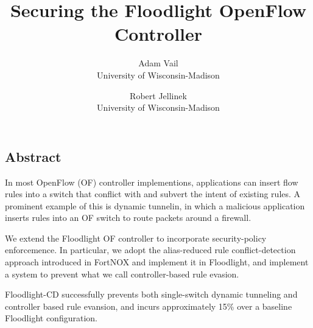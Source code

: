 \documentclass[letterpaper,twocolumn,10pt]{article}
\begin{document}
\date{}

\title{\Large \bf Securing the Floodlight OpenFlow Controller}

\author{
{\rm Adam Vail}\\
University of Wisconsin-Madison
\and
{\rm Robert Jellinek}\\
University of Wisconsin-Madison
} %

\maketitle

\thispagestyle{empty}


\subsection*{Abstract}
In most OpenFlow (OF) controller implementions, applications can insert flow rules into a switch that conflict with and subvert the intent of existing rules. A prominent example of this is dynamic tunnelin, in which a malicious application inserts rules into an OF switch to route packets around a firewall. 

We extend the Floodlight OF controller to incorporate security-policy enforcemence. In particular, we adopt the alias-reduced rule conflict-detection approach introduced in FortNOX and implement it in Floodlight, and implement a system to prevent what we call controller-based rule evasion. 

Floodlight-CD successfully prevents both single-switch dynamic tunneling and controller based rule evansion, and incurs approximately 15\% over a baseline Floodlight configuration.





%
%

% 




\end{document}
